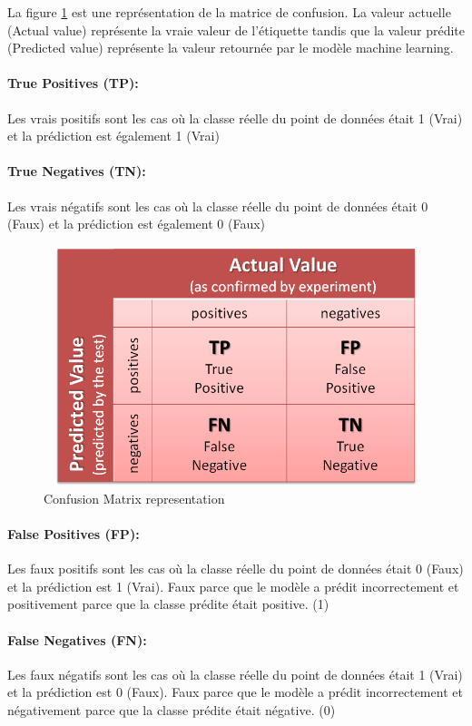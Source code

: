 \documentclass[12pt, french]{report}
\begin{document}
La figure \ref{confusionmatrix} est une représentation de la matrice de confusion. La valeur actuelle (Actual value) représente la vraie valeur de l'étiquette tandis que la valeur prédite (Predicted value) représente la valeur retournée par le modèle machine learning. 
\paragraph*{True Positives (TP):}
Les vrais positifs sont les cas où la classe réelle du point de données était 1 (Vrai) et la prédiction est également 1 (Vrai)
\paragraph*{True Negatives (TN):}
Les vrais négatifs sont les cas où la classe réelle du point de données était 0 (Faux) et la prédiction est également 0 (Faux)

\begin{figure}[h]
\includegraphics[width=14cm, height=7cm]{images/confusionmatrix.png}
\caption{Confusion Matrix representation \cite{key25}}
\label{confusionmatrix}
\end{figure}

\paragraph*{False Positives (FP):}
Les faux positifs sont les cas où la classe réelle du point de données était 0 (Faux) et la prédiction est 1 (Vrai). Faux parce que le modèle a prédit incorrectement et positivement parce que la classe prédite était positive. (1)
\paragraph*{False Negatives (FN):}
Les faux négatifs sont les cas où la classe réelle du point de données était 1 (Vrai) et la prédiction est 0 (Faux). Faux parce que le modèle a prédit incorrectement et négativement parce que la classe prédite était négative. (0)
\end{document}
